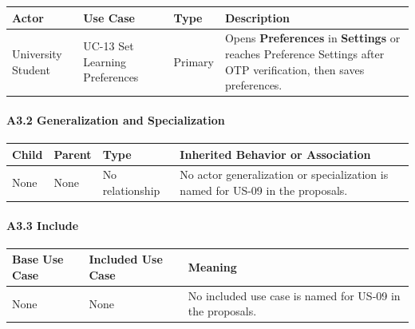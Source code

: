 \documentclass[12pt]{article}
\renewcommand{\baselinestretch}{1.5}
\begin{document}
\begingroup
\small
\renewcommand{\baselinestretch}{1.0}\selectfont
\renewcommand{\arraystretch}{1.15}
\setlength{\tabcolsep}{6pt}
\begin{longtable}{|>{\raggedright\arraybackslash}p{}|>{\raggedright\arraybackslash}p{}|>{\raggedright\arraybackslash}p{}|>{\raggedright\arraybackslash}p{}|}
\hline
\textbf{Actor} & \textbf{Use Case} & \textbf{Type} & \textbf{Description} \\ \hline
\endhead
University Student & UC-13 Set Learning Preferences & Primary & Opens \textbf{Preferences} in \textbf{Settings} or reaches Preference Settings after OTP verification, then saves preferences. \\ \hline
\end{longtable}
\endgroup
\par\medskip

\hypertarget{sec:a3-2-generalization-and-specialization}{}
\paragraph*{A3.2 Generalization and Specialization}
\par\medskip

\begingroup
\small
\renewcommand{\baselinestretch}{1.0}\selectfont
\renewcommand{\arraystretch}{1.15}
\setlength{\tabcolsep}{6pt}
\begin{longtable}{|>{\raggedright\arraybackslash}p{}|>{\raggedright\arraybackslash}p{}|>{\raggedright\arraybackslash}p{}|>{\raggedright\arraybackslash}p{}|}
\hline
\textbf{Child} & \textbf{Parent} & \textbf{Type} & \textbf{Inherited Behavior or Association} \\ \hline
\endhead
None & None & No relationship & No actor generalization or specialization is named for US-09 in the proposals. \\ \hline
\end{longtable}
\endgroup
\par\medskip

\hypertarget{sec:a3-3-include}{}
\paragraph*{A3.3 Include}
\par\medskip

\begingroup
\small
\renewcommand{\baselinestretch}{1.0}\selectfont
\renewcommand{\arraystretch}{1.15}
\setlength{\tabcolsep}{6pt}
\begin{longtable}{|>{\raggedright\arraybackslash}p{}|>{\raggedright\arraybackslash}p{}|>{\raggedright\arraybackslash}p{}|}
\hline
\textbf{Base Use Case} & \textbf{Included Use Case} & \textbf{Meaning} \\ \hline
\endhead
None & None & No included use case is named for US-09 in the proposals. \\ \hline
\end{longtable}
\endgroup
\par\medskip
\end{document}
